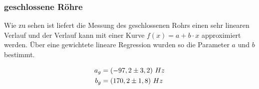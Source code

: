 \subsubsection{geschlossene Röhre}
Wie zu sehen ist liefert die Messung des geschlossenen Rohrs einen sehr linearen Verlauf und der Verlauf kann mit einer Kurve \(f(x)=a+b \cdot x\) approximiert werden. Über eine gewichtete lineare Regression wurden so die Parameter \(a\) und \(b\) bestimmt.

\begin{center}
\noindent
\begin{minipage}{\linewidth}
\centering
{}
\end{minipage}
\end{center}

\begin{align}
a_g &= \left( -97,2 \pm 3,2 \right)\, Hz \notag \\ 
b_g &= \left( 170,2 \pm 1,8 \right)\, Hz \notag
\end{align}

